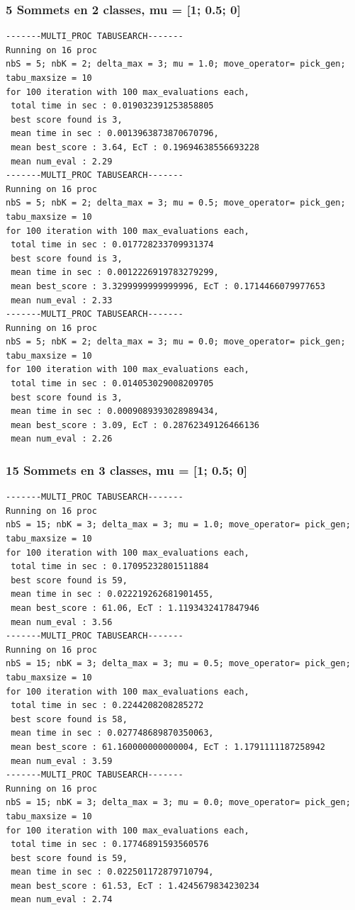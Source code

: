 \documentclass[a4paper]{article}
\begin{document}
\subsubsection{5 Sommets en 2 classes, mu = [1; 0.5; 0]}
\begin{verbatim}
-------MULTI_PROC TABUSEARCH-------
Running on 16 proc
nbS = 5; nbK = 2; delta_max = 3; mu = 1.0; move_operator= pick_gen;
tabu_maxsize = 10
for 100 iteration with 100 max_evaluations each, 
 total time in sec : 0.019032391253858805
 best score found is 3,
 mean time in sec : 0.0013963873870670796,
 mean best_score : 3.64, EcT : 0.19694638556693228
 mean num_eval : 2.29
-------MULTI_PROC TABUSEARCH-------
Running on 16 proc
nbS = 5; nbK = 2; delta_max = 3; mu = 0.5; move_operator= pick_gen;
tabu_maxsize = 10
for 100 iteration with 100 max_evaluations each, 
 total time in sec : 0.017728233709931374
 best score found is 3,
 mean time in sec : 0.0012226919783279299,
 mean best_score : 3.3299999999999996, EcT : 0.1714466079977653
 mean num_eval : 2.33
-------MULTI_PROC TABUSEARCH-------
Running on 16 proc
nbS = 5; nbK = 2; delta_max = 3; mu = 0.0; move_operator= pick_gen;
tabu_maxsize = 10
for 100 iteration with 100 max_evaluations each, 
 total time in sec : 0.014053029008209705
 best score found is 3,
 mean time in sec : 0.0009089393028989434,
 mean best_score : 3.09, EcT : 0.28762349126466136
 mean num_eval : 2.26
\end{verbatim}
\subsubsection{15 Sommets en 3 classes, mu = [1; 0.5; 0]}
\begin{verbatim}
-------MULTI_PROC TABUSEARCH-------
Running on 16 proc
nbS = 15; nbK = 3; delta_max = 3; mu = 1.0; move_operator= pick_gen;
tabu_maxsize = 10
for 100 iteration with 100 max_evaluations each, 
 total time in sec : 0.17095232801511884
 best score found is 59,
 mean time in sec : 0.022219262681901455,
 mean best_score : 61.06, EcT : 1.1193432417847946
 mean num_eval : 3.56
-------MULTI_PROC TABUSEARCH-------
Running on 16 proc
nbS = 15; nbK = 3; delta_max = 3; mu = 0.5; move_operator= pick_gen;
tabu_maxsize = 10
for 100 iteration with 100 max_evaluations each, 
 total time in sec : 0.2244208208285272
 best score found is 58,
 mean time in sec : 0.027748689870350063,
 mean best_score : 61.160000000000004, EcT : 1.1791111187258942
 mean num_eval : 3.59
-------MULTI_PROC TABUSEARCH-------
Running on 16 proc
nbS = 15; nbK = 3; delta_max = 3; mu = 0.0; move_operator= pick_gen;
tabu_maxsize = 10
for 100 iteration with 100 max_evaluations each, 
 total time in sec : 0.17746891593560576
 best score found is 59,
 mean time in sec : 0.022501172879710794,
 mean best_score : 61.53, EcT : 1.4245679834230234
 mean num_eval : 2.74
\end{verbatim}
\end{document}
